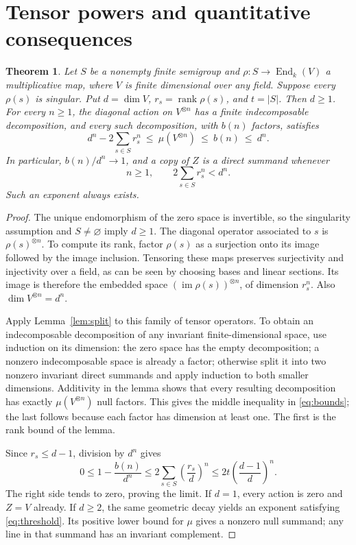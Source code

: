 \documentclass[11pt]{article}
\newtheorem{theorem}{Theorem}
\newcommand{\rank}{\operatorname{rank}}
\newcommand{\im}{\operatorname{im}}
\begin{document}
\section{Tensor powers and quantitative consequences}
\begin{theorem}\label{thm:main}
Let \(S\) be a nonempty finite semigroup and
\(\rho:S\to\operatorname{End}_k(V)\) a multiplicative map, where \(V\) is finite
dimensional over any field. Suppose every \(\rho(s)\) is singular. Put
\(d=\dim V\), \(r_s=\rank\rho(s)\), and \(t=|S|\). Then \(d\geq1\).
For every \(n\geq1\), the diagonal action on \(V^{\otimes n}\) has a finite
indecomposable decomposition, and every such decomposition, with \(b(n)\)
factors, satisfies
\begin{equation}\label{eq:bounds}
 d^n-2\sum_{s\in S}r_s^n\ \leq\ \mu(V^{\otimes n})\ \leq\ b(n)\ \leq\ d^n.
\end{equation}
In particular, \(b(n)/d^n\to1\), and a copy of \(Z\) is a direct summand
whenever
\begin{equation}\label{eq:threshold}
 n\geq1,\qquad 2\sum_{s\in S}r_s^n<d^n.
\end{equation}
Such an exponent always exists.
\end{theorem}
\begin{proof}
The unique endomorphism of the zero space is invertible, so the singularity
assumption and \(S\ne\varnothing\) imply \(d\geq1\).
The diagonal operator associated to \(s\) is \(\rho(s)^{\otimes n}\).
To compute its rank, factor \(\rho(s)\) as a surjection onto its image followed
by the image inclusion. Tensoring these maps preserves surjectivity and
injectivity over a field, as can be seen by choosing bases and linear sections.
Its image is therefore the embedded space \((\im\rho(s))^{\otimes n}\), of
dimension \(r_s^n\). Also \(\dim V^{\otimes n}=d^n\).

Apply Lemma~\ref{lem:split} to this family of tensor operators. To obtain an
indecomposable decomposition of any invariant finite-dimensional space, use
induction on its dimension: the zero space has the empty decomposition; a
nonzero indecomposable space is already a factor; otherwise split it into two
nonzero invariant direct summands and apply induction to both smaller dimensions.
Additivity in the lemma shows that every resulting decomposition has exactly
\(\mu(V^{\otimes n})\) null factors. This gives the middle inequality in
\eqref{eq:bounds}; the last follows because each factor has dimension at least
one. The first is the rank bound of the lemma.

Since \(r_s\leq d-1\), division by \(d^n\) gives
\begin{equation}\label{eq:error}
 0\leq1-\frac{b(n)}{d^n}
 \leq2\sum_{s\in S}\left(\frac{r_s}{d}\right)^n
 \leq2t\left(\frac{d-1}{d}\right)^n.
\end{equation}
The right side tends to zero, proving the limit. If \(d=1\), every action is
zero and \(Z=V\) already. If \(d\geq2\), the same geometric decay yields an
exponent satisfying \eqref{eq:threshold}. Its positive lower bound for \(\mu\)
gives a nonzero null summand; any line in that summand has an invariant complement.
\end{proof}
\end{document}
